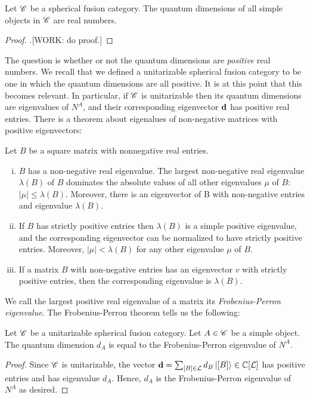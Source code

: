 \begin{corollary} Let $\mathscr{C}$ be a spherical fusion category. The quantum dimensions of all simple objects in $\mathscr{C}$ are real numbers.
\end{corollary}
\begin{proof}.[WORK: do proof.]
\end{proof}

The question is whether or not the quantum dimensions are \textit{positive} real numbers. We recall that we defined a unitarizable spherical fusion category to be one in which the quantum dimensions are all positive. It is at this point that this becomes relevant. In particular, if $\mathscr{C}$ is unitarizable then its quantum dimensions are eigenvalues of $N^A$, and their corresponding eigenvector $\bold{d}$ has positive real entries. There is a theorem about eigenalues of non-negative matrices with positive eigenvectors:

\begin{theorem} Let $B$ be a square matrix with nonnegative real entries.

\begin{enumerate}[(i)]
\item $B$ has a non-negative real eigenvalue. The largest non-negative real eigenvalue $\lambda(B)$ of $B$ dominates the absolute values of all other eigenvalues $\mu$ of $B$: $|\mu|\leq \lambda(B)$. Moreover, there is an eigenvector of B with non-negative entries
and eigenvalue $\lambda(B)$.
\item If $B$ has strictly positive entries then $\lambda(B)$ is a simple positive eigenvalue, and the corresponding eigenvector can be normalized to have strictly positive entries. Moreover, $|\mu| < \lambda(B)$ for any other eigenvalue $\mu$ of $B$.
\item If a matrix $B$ with non-negative entries has an eigenvector $v$ with strictly
positive entries, then the corresponding eigenvalue is $\lambda(B)$.
\end{enumerate}
\end{theorem}

We call the largest positive real eigenvalue of a matrix its \textit{Frobenius-Perron eigenvalue}. The Frobenius-Perron theorem tells us the following:

\begin{corollary} Let $\mathscr{C}$ be a unitarizable spherical fusion category. Let $A\in \mathscr{C}$ be a simple object. The quantum dimension $d_A$ is equal to the Frobenius-Perron eigenvalue of $N^A$.
\end{corollary}
\begin{proof} Since $\mathscr{C}$  is unitarizable, the vector $\bold{d} = \sum_{[B]\in \mathcal{L}} d_{B}\ket{[B]}\in \mathbb{C}[\mathcal{L}]$ has positive entries and has eigenvalue $d_A$. Hence, $d_A$ is the Frobenius-Perron eigenvalue of $N^A$ as desired.
\end{proof}

